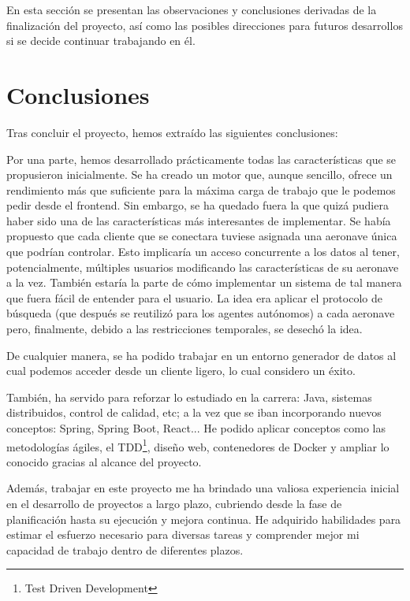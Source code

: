 
En esta sección se presentan las observaciones y conclusiones derivadas de la finalización del proyecto, así como las posibles direcciones para futuros desarrollos si se decide continuar trabajando en él.


\section{Conclusiones}
Tras concluir el proyecto, hemos extraído las siguientes conclusiones:

Por una parte, hemos desarrollado prácticamente todas las características que se propusieron inicialmente. Se ha creado un motor que, aunque sencillo, ofrece un rendimiento más que suficiente para la máxima carga de trabajo que le podemos pedir desde el frontend. Sin embargo, se ha quedado fuera la que quizá pudiera haber sido una de las características más interesantes de implementar. Se había propuesto que cada cliente que se conectara tuviese asignada una aeronave única que podrían controlar. Esto implicaría un acceso concurrente a los datos al tener, potencialmente, múltiples usuarios modificando las características de su aeronave a la vez. También estaría la parte de cómo implementar un sistema de tal manera que fuera fácil de entender para el usuario. La idea era aplicar el protocolo de búsqueda (que después se reutilizó para los agentes autónomos) a cada aeronave pero, finalmente, debido a las restricciones temporales, se desechó la idea. 

De cualquier manera, se ha podido trabajar en un entorno generador de datos al cual podemos acceder desde un cliente ligero, lo cual considero un éxito. 

También, ha servido para reforzar lo estudiado en la carrera: Java, sistemas distribuidos, control de calidad, etc; a la vez que se iban incorporando nuevos conceptos: Spring, Spring Boot, React... He podido aplicar conceptos como las metodologías ágiles, el TDD\footnote{Test Driven Development}, diseño web, contenedores de Docker y ampliar lo conocido gracias al alcance del proyecto.

Además, trabajar en este proyecto me ha brindado una valiosa experiencia inicial en el desarrollo de proyectos a largo plazo, cubriendo desde la fase de planificación hasta su ejecución y mejora continua. He adquirido habilidades para estimar el esfuerzo necesario para diversas tareas y comprender mejor mi capacidad de trabajo dentro de diferentes plazos. 

